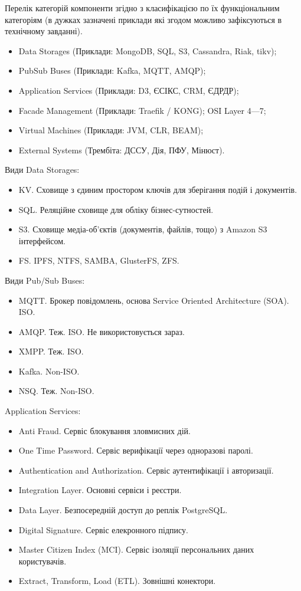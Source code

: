 \documentclass{article}
\begin{document}
Перелік категорій компоненти згідно з класифікацією по їх функціональним категоріям (в дужках зазначені
приклади які згодом можливо зафіксуються в технічному завданні).

\begin{itemize}
  \item Data Storages (Приклади: MongoDB, SQL, S3, Cassandra, Riak, tikv);
  \item PubSub Buses (Приклади: Kafka, MQTT, AMQP);
  \item Application Services (Приклади: D3, ЄСІКС, CRM, ЄДРДР);
  \item Facade Management (Приклади: Traefik / KONG); OSI Layer 4—7;
  \item Virtual Machines (Приклади: JVM, CLR, BEAM);
  \item External Systems (Трембіта: ДССУ, Дія, ПФУ, Мінюст).
\end{itemize}

Види Data Storages:
\begin{itemize}
  \item KV. Сховище з єдиним простором ключів для зберігання подій і документів.
  \item SQL. Реляційне сховище для обліку бізнес-сутностей.
  \item S3. Сховище медіа-об'єктів (документів, файлів, тощо) з Amazon S3 інтерфейсом.
  \item FS. IPFS, NTFS, SAMBA, GlusterFS, ZFS.
\end{itemize}

Види Pub/Sub Buses:
\begin{itemize}
  \item MQTT. Брокер повідомлень, основа Service Oriented Architecture (SOA). ISO.
  \item AMQP. Теж. ISO. Не використовується зараз.
  \item XMPP. Теж. ISO.
  \item Kafka. Non-ISO.
  \item NSQ. Теж. Non-ISO.
\end{itemize}

Application Services:

\begin{itemize}
  \item Anti Fraud. Сервіс блокування зловмисних дій.
  \item One Time Password. Сервіс верифікації через одноразові паролі.
  \item Authentication and Authorization. Сервіс аутентифікації і авторизації.
  \item Integration Layer. Основні сервіси і реєстри.
  \item Data Layer. Безпосередній доступ до реплік PostgreSQL.
  \item Digital Signature. Сервіс елекронного підпису.
  \item Master Citizen Index (MCI). Сервіс ізоляції персональних даних користувачів.
  \item Extract, Transform, Load (ETL). Зовнішні конектори.
\end{itemize}
\end{document}
